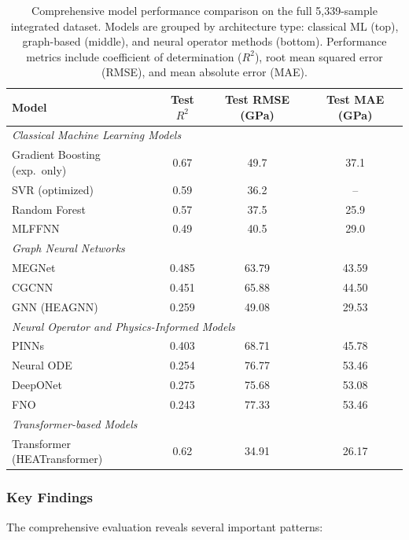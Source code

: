 \documentclass[11pt,a4paper]{article}
\begin{document}
\begin{table}[htbp]
\centering
\caption{Comprehensive model performance comparison on the full 5{,}339-sample integrated dataset. Models are grouped by architecture type: classical ML (top), graph-based (middle), and neural operator methods (bottom). Performance metrics include coefficient of determination ($R^2$), root mean squared error (RMSE), and mean absolute error (MAE).}
\label{tab:comprehensive_results}
\begin{tabular}{lccc}
\hline
\textbf{Model} & \textbf{Test $R^2$} & \textbf{Test RMSE (GPa)} & \textbf{Test MAE (GPa)} \\
\hline
\multicolumn{4}{l}{\textit{Classical Machine Learning Models}} \\
\hline
Gradient Boosting (exp.\ only) & 0.67 & 49.7 & 37.1 \\
SVR (optimized) & 0.59 & 36.2 & -- \\
Random Forest & 0.57 & 37.5 & 25.9 \\
MLFFNN & 0.49 & 40.5 & 29.0 \\
\hline
\multicolumn{4}{l}{\textit{Graph Neural Networks}} \\
\hline
MEGNet & 0.485 & 63.79 & 43.59 \\
CGCNN & 0.451 & 65.88 & 44.50 \\
GNN (HEAGNN) & 0.259 & 49.08 & 29.53 \\
\hline
\multicolumn{4}{l}{\textit{Neural Operator and Physics-Informed Models}} \\
\hline
PINNs & 0.403 & 68.71 & 45.78 \\
Neural ODE & 0.254 & 76.77 & 53.46 \\
DeepONet & 0.275 & 75.68 & 53.08 \\
FNO & 0.243 & 77.33 & 53.46 \\
\hline
\multicolumn{4}{l}{\textit{Transformer-based Models}} \\
\hline
Transformer (HEATransformer) & 0.62 & 34.91 & 26.17 \\
\hline
\end{tabular}
\end{table}

\subsubsection{Key Findings}

The comprehensive evaluation reveals several important patterns:
\end{document}
